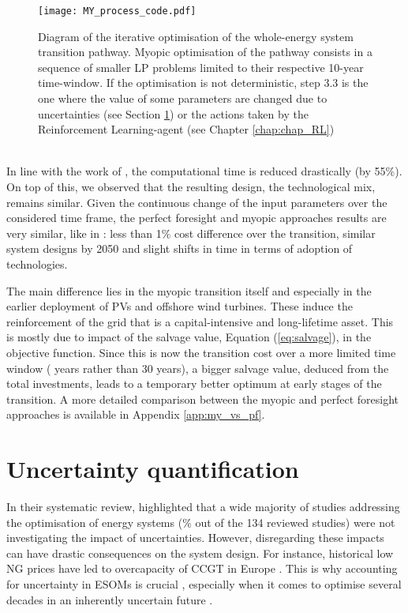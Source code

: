 \begin{figure}[htbp!]
\centering
\texttt{[image: MY\_process\_code.pdf]}
\caption{Diagram of the iterative optimisation of the whole-energy system transition pathway. Myopic optimisation of the pathway consists in a sequence of smaller \gls{LP} problems limited to their respective 10-year time-window. If the optimisation is not deterministic, step 3.3 is the one where the value of some parameters are changed due to uncertainties (see Section \ref{sec:meth:UQ}) or the actions taken by the Reinforcement Learning-agent (see Chapter \ref{chap:chap_RL})}
\label{fig:MY_process_code}
\end{figure}

\\

\noindent
In line with the work of \citet{babrowski2014reducing}, the computational time is reduced drastically (\ie by 55\%). On top of this, we observed that the resulting design, \ie the technological mix, remains similar.  Given the continuous change of the input parameters over the considered time frame, the perfect foresight and myopic approaches results are very similar, like in \cite{krey2006vergleich}: less than 1\% cost difference over the transition, similar system designs by 2050 and slight shifts in time in terms of adoption of technologies. 

The main difference lies in the myopic transition itself and especially in the earlier deployment of PVs and offshore wind turbines. These induce the reinforcement of the grid that is a capital-intensive and long-lifetime asset. This is mostly due to impact of the salvage value, Equation (\ref{eq:salvage}), in the objective function. Since this is now the transition cost over a more limited time window ( years rather than 30 years), a bigger salvage value, deduced from the total investments, leads to a temporary better optimum at early stages of the transition. A more detailed comparison between the myopic and perfect foresight approaches is available in Appendix \ref{app:my_vs_pf}.

\section{Uncertainty quantification}
\label{sec:meth:UQ}
In their systematic review, \citet{yue2018review} highlighted that a wide majority of studies addressing the optimisation of energy systems (\% out of the 134 reviewed studies) were not investigating the impact of uncertainties. However, disregarding these impacts can have drastic consequences on the system design. For instance, historical low \gls{NG} prices have led to overcapacity of \gls{CCGT} in Europe \cite{moret2020overcapacity}. This is why accounting for uncertainty in \gls{ESOMs} is crucial \cite{mavromatidis2018uncertainty}, especially when it comes to optimise several decades in an inherently uncertain future \cite{peace2008insights}.

